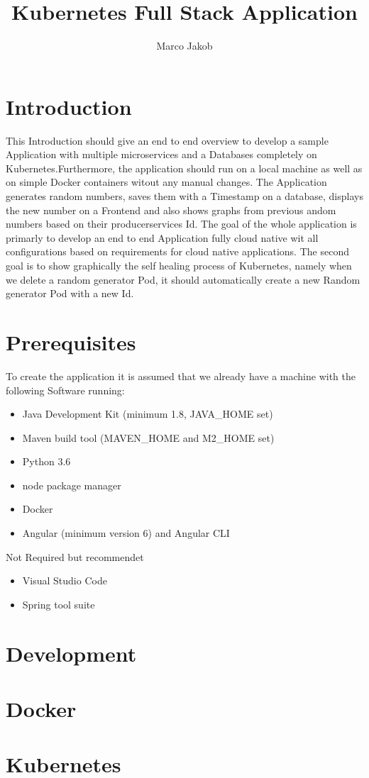 \documentclass{article}
\author{Marco Jakob}
\title{Kubernetes Full Stack Application}
\begin{document}
\maketitle
\newpage
\tableofcontents
\newpage

\section{Introduction}
This Introduction should give an end to end overview to develop a sample Application with multiple microservices and a Databases completely on Kubernetes.Furthermore, the application should run on a local machine as well as on simple Docker containers witout any manual changes.
The Application generates random numbers, saves them with a Timestamp on a database, displays the new number on a Frontend and also shows graphs from previous andom numbers based on their producerservices Id.
The goal of the whole application is primarly to develop an end to end Application fully cloud native wit all configurations based on requirements for cloud native applications. The second goal is to show graphically the self healing process of Kubernetes, namely when we delete a random generator Pod, it should automatically create a new Random generator Pod with a new Id.
\section{Prerequisites}
To create the application it is assumed that we already have a machine with the following Software running:
\begin{itemize}
\item Java Development Kit (minimum 1.8, JAVA\_HOME set) 
\item Maven build tool (MAVEN\_HOME and M2\_HOME set)
\item Python 3.6
\item node package manager
\item Docker
\item Angular (minimum version 6) and Angular CLI
\end{itemize}
Not Required but recommendet
\begin{itemize}
\item Visual Studio Code
\item Spring tool suite
\end{itemize}
\newpage

\newpage
\section{Development}

\newpage
\section{Docker}

\newpage
\section{Kubernetes}

\end{document}
